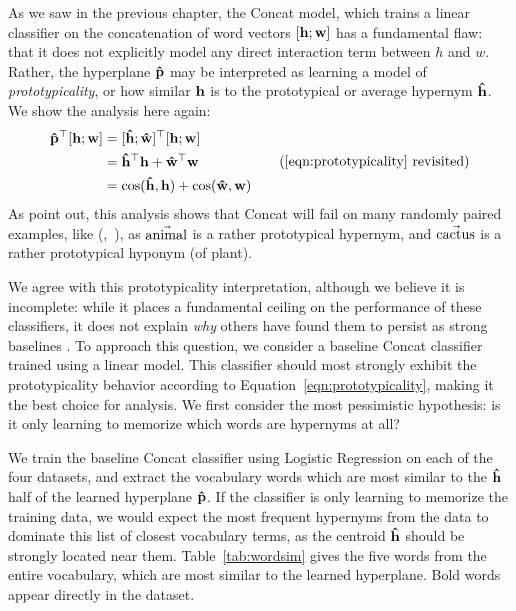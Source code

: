 As we saw in the previous chapter, the Concat model, which trains a linear
classifier on the concatenation of word vectors $[{\mathbf{h}}; {\mathbf{w}}]$ has a fundamental
flaw: that it does not explicitly model any direct interaction term between
$h$ and $w$. Rather, the hyperplane ${\mathbf{\hat p}}$ may be interpreted as learning
a model of {\em prototypicality}, or how similar ${\mathbf{h}}$ is to the prototypical
or average hypernym ${\mathbf{\hat h}}$. We show the analysis here again:
\begin{align}
  \begin{split}
  \vhatp^\top \wordpair & = \protopair^\top \wordpair\\
  & = \vhath^\top\vh + \vhatw^\top\vw\\
  & = \mbox{cos}(\vhath, \vh) + \mbox{cos}(\vhatw, \vw)
  \end{split}
\tag{\ref{eqn:prototypicality} revisited}
\end{align}
As  point out, this analysis shows that Concat will
fail on many randomly paired examples, like (,~), as
$\vec{\mbox{animal}}$ is a rather prototypical hypernym, and $\vec{\mbox{cactus}}$ is
a rather prototypical hyponym (of plant).

We agree with this prototypicality interpretation, although we believe it is incomplete:
while it places a fundamental ceiling on the performance of these classifiers, it
does not explain {\em why} others have found them to persist as strong
baselines
\cite{weeds:2014:coling,roller:2014:coling,kruszewski:2015:tacl,vylomova:2016:acl}.
To approach this question, we consider a baseline Concat classifier trained
using a linear model. This classifier should most strongly exhibit the prototypicality
behavior according to Equation~\ref{eqn:prototypicality}, making it the best
choice for analysis. We first consider the most pessimistic hypothesis: is it
only learning to memorize which words are hypernyms at all?

We train the baseline Concat classifier using Logistic Regression on each of
the four datasets, and extract the vocabulary words which are most similar to
the ${\mathbf{\hat h}}$ half of the learned hyperplane ${\mathbf{\hat p}}$. If the classifier is only
learning to memorize the training data, we would expect the most frequent
hypernyms from the data to dominate this list of closest vocabulary terms, as
the centroid ${\mathbf{\hat h}}$ should be strongly located near them.
Table~\ref{tab:wordsim} gives the five words from the entire vocabulary, which
are most similar to the learned hyperplane. Bold words appear directly in
the dataset.

